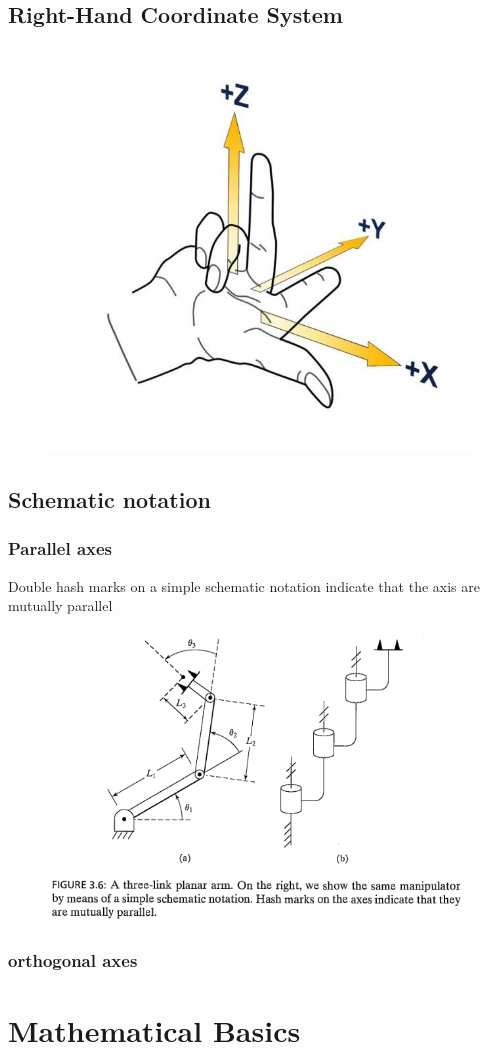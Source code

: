 \documentclass[10pt,a4paper]{article}
\begin{document}
\subsection{Right-Hand Coordinate System}
\begin{figure}[H]
	\includegraphics[width=0.5\columnwidth]{imgs/hand_xyz.jpg}
\end{figure}

\subsection{Schematic notation}

\subsubsection{Parallel axes}
Double hash marks on a simple schematic notation indicate that the axis are mutually parallel
\begin{figure}[H]
	\includegraphics[width=0.5\columnwidth]{imgs/3R_arm.png}
\end{figure}

\subsubsection{orthogonal axes}


\section{Mathematical Basics}
\end{document}
